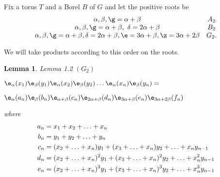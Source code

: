 \documentclass{memo-l}
\newtheorem{lemma}[theorem]{Lemma}
\theoremstyle{definition}
\theoremstyle{remark}
\numberwithin{section}{chapter}
\numberwithin{equation}{chapter}
\begin{document}
   Fix a torus $T$ and a Borel $B$ of $G$ and let the positive roots be
$$
\begin{matrix} 
{\alpha}, {\beta}, {\g} = {\alpha}+{\beta}  &  A_{2} \\
{\alpha}, {\beta}, {\g} = {\alpha}+{\beta},\ {\delta} = 2{\alpha}+{\beta} 
&  B_{2} \\
{\alpha}, {\beta}, {\g} = {\alpha}+{\beta}, {\delta} = 2{\alpha}+{\beta}, 
{\e} = 3{\alpha}+{\beta}, {\z} = 3{\alpha}+2{\beta} & G_{2} .
\end{matrix}
$$

We will take products according to this order on the roots.

\medskip

\begin{lemma}{Lemma 1.2}   $(G_{2})$

${\e}_{\alpha}(x_{1}){\e}_{\beta}(y_{1}){\e}_{\alpha}
(x_{2}){\e}_{\beta}(y_{2})\ldots 
{\e}_{\alpha}(x_{n}){\e}_{\beta}(y_{n}) = $

${\e}_{\alpha}(a_{n}){\e}_{\beta}(b_{n}){\e}_{{\alpha} + 
{\beta}}(c_{n}){\e}_{2{\alpha}+{\beta}}(d_{n}){\e}_{3{\alpha} + 
{\beta}}(e_{n}){\e}_{3{\alpha}+2{\beta}}(f_{n})$

\noindent
where
$$
\aligned
a_{n} &= x_{1} + x_{2} +\ldots + x_{n} \\
b_{n} &= y_{1} + y_{2} +\ldots + y_{n} \\
c_{n} &= (x_{2}+\ldots +x_{n})y_{1} + (x_{3}+\ldots +x_{n})y_{2} + \ldots + 
x_{n}y_{n-1}\\
d_{n} &= (x_{2}+\ldots +x_{n})^{2}y_{1} + (x_{3}+\ldots +x_{n})^{2}y_{2} + 
\ldots + x_{n}^{2}y_{n-1}\\
e_{n} &= (x_{2}+\ldots +x_{n})^{3}y_{1} + (x_{3}+\ldots +x_{n})^{3}y_{2} + 
\ldots + x_{n}^{3}y_{n-1}
\endaligned
$$
\end{lemma}
\end{document}
